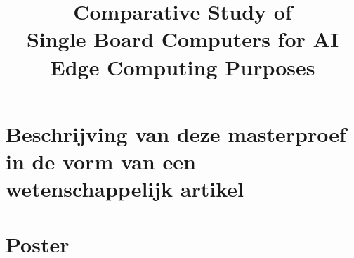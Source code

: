 \documentclass[11pt,a4paper,twoside,openright]{report}
\title{Comparative Study of \\Single Board Computers for AI Edge Computing Purposes}
\begin{document}

\preface
\lstlistoflistings












\appendix


\chapter{Beschrijving van deze masterproef in de vorm van een wetenschappelijk artikel}
%

\chapter{Poster}



\end{document}
